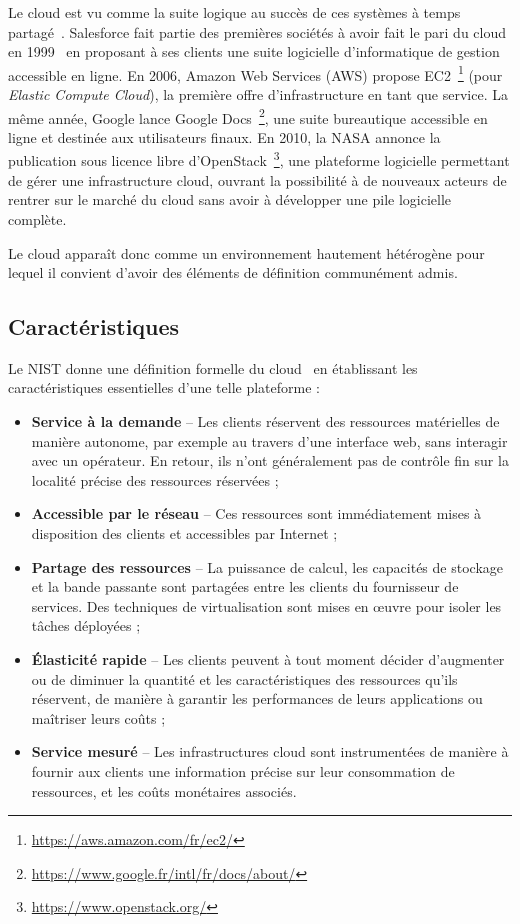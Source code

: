 Le cloud est vu comme la suite logique au succès de ces systèmes à temps partagé~\cite{hayesCloudComputing2008}. Salesforce fait partie des premières sociétés à avoir fait le pari du cloud en 1999~\cite{weissmanDesignForceCom2009} en proposant à ses clients une suite logicielle d'informatique de gestion accessible en ligne. En 2006, Amazon Web Services (\gls{AWS}) propose EC2~\footnote{\href{https://aws.amazon.com/fr/ec2/}{https://aws.amazon.com/fr/ec2/}} (pour \textit{Elastic Compute Cloud}), la première offre d'infrastructure en tant que service. La même année, Google lance Google Docs~\footnote{\href{https://www.google.fr/intl/fr/docs/about/}{https://www.google.fr/intl/fr/docs/about/}}, une suite bureautique accessible en ligne et destinée aux utilisateurs finaux. En 2010, la NASA annonce la publication sous licence libre d'OpenStack~\footnote{\href{https://www.openstack.org/}{https://www.openstack.org/}}, une plateforme logicielle permettant de gérer une infrastructure cloud, ouvrant la possibilité à de nouveaux acteurs de rentrer sur le marché du cloud sans avoir à développer une pile logicielle complète.

Le cloud apparaît donc comme un environnement hautement hétérogène pour lequel il convient d'avoir des éléments de définition communément admis.

\subsection{Caractéristiques}

Le \gls{NIST} donne une définition formelle du cloud~\cite{mellNISTDefinitionCloud} en établissant les caractéristiques essentielles d'une telle plateforme :

\begin{itemize}
    \item \textbf{Service à la demande} -- Les clients réservent des ressources matérielles de manière autonome, par exemple au travers d'une interface web, sans interagir avec un opérateur. En retour, ils n'ont généralement pas de contrôle fin sur la localité précise des ressources réservées ;
    \item \textbf{Accessible par le réseau} -- Ces ressources sont immédiatement mises à disposition des clients et accessibles par Internet ;
    \item \textbf{Partage des ressources} -- La puissance de calcul, les capacités de stockage et la bande passante sont partagées entre les clients du fournisseur de services. Des techniques de virtualisation sont mises en œuvre pour isoler les tâches déployées ;
    \item \textbf{Élasticité rapide} -- Les clients peuvent à tout moment décider d'augmenter ou de diminuer la quantité et les caractéristiques des ressources qu'ils réservent, de manière à garantir les performances de leurs applications ou maîtriser leurs coûts ;
    \item \textbf{Service mesuré} -- Les infrastructures cloud sont instrumentées de manière à fournir aux clients une information précise sur leur consommation de ressources, et les coûts monétaires associés.
\end{itemize}

